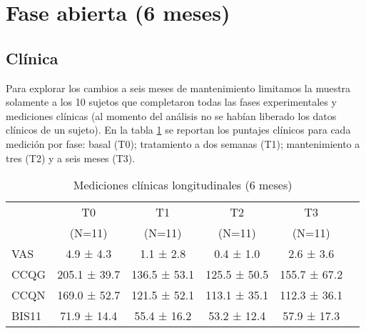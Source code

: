 \section{Fase abierta (6 meses)}
\subsection{Clínica}

Para explorar los cambios a seis meses de mantenimiento limitamos la muestra solamente a los 10 sujetos que completaron todas las fases experimentales y mediciones clínicas (al momento del análisis no se habían liberado los datos clínicos de un sujeto). En la tabla \ref{tab:cl3} se reportan los puntajes clínicos para cada medición por fase: basal (T0); tratamiento a dos semanas (T1); mantenimiento a tres (T2) y a seis meses (T3).

\begin{table}[!hbp]
    \centering
    \small
    \caption{Mediciones clínicas longitudinales (6 meses)}
    \label{tab:cl3}
\begin{tabular}{lccccc}
\hline
 & T0 & T1 & T2 & T3 \\
 & (N=11) & (N=11) & (N=11) & (N=11) \\
\hline
VAS   &  4.9 ±  4.3 &  1.1 ±  2.8 &  0.4 ±  1.0 &  2.6 ±  3.6 \\
CCQG  & 205.1 ± 39.7 & 136.5 ± 53.1 & 125.5 ± 50.5 & 155.7 ± 67.2 \\
CCQN  & 169.0 ± 52.7 & 121.5 ± 52.1 & 113.1 ± 35.1 & 112.3 ± 36.1 \\
BIS11 & 71.9 ± 14.4 & 55.4 ± 16.2 & 53.2 ± 12.4 & 57.9 ± 17.3 \\
\hline
\end{tabular}
\end{table}

